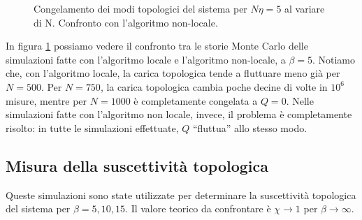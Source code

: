 \documentclass[a4paper,11pt]{article}
\begin{document}
    \begin{figure}[htb]
        \centering
        \caption{Congelamento dei modi topologici del sistema per $N\eta = 5$ al variare di N. Confronto con l'algoritmo non-locale.}
        \label{fig:csd_topfreezing}
    \end{figure}
    
    In figura \ref{fig:csd_topfreezing} possiamo vedere il confronto tra le storie Monte Carlo delle simulazioni fatte con l'algoritmo locale e l'algoritmo non-locale, a $\beta = 5$. Notiamo che, con l'algoritmo locale, la carica topologica tende a fluttuare meno già per $N = 500$. Per $N = 750$, la carica topologica cambia poche decine di volte in $10^6$ misure, mentre per $N = 1000$ è completamente congelata a $Q = 0$. Nelle simulazioni fatte con l'algoritmo non locale, invece, il problema è completamente risolto: in tutte le simulazioni effettuate, $Q$ ``fluttua'' allo stesso modo.
    
    \subsection{Misura della suscettività topologica}
    
    Queste simulazioni sono state utilizzate per determinare la suscettività topologica del sistema per $\beta = 5, 10, 15$. Il valore teorico da confrontare è $\chi \to 1$ per $\beta \to \infty$.
    
\end{document}
